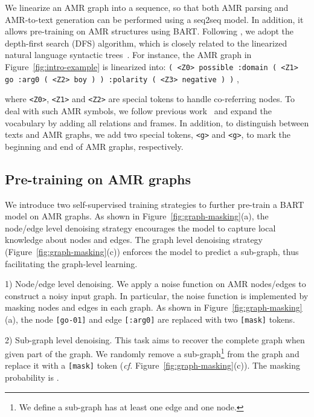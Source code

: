 \documentclass[11pt]{article}
\begin{document}
We linearize an AMR graph into a sequence, so that both AMR parsing and AMR-to-text generation can be performed using a seq2seq model.
In addition, it allows pre-training on AMR structures using BART.
Following \citet{konstas2017neural}, we adopt the depth-first search (DFS) algorithm, which is closely related to the linearized natural language syntactic trees~\cite{Bevilacqua_Blloshmi_Navigli_2021}.
For instance, the AMR graph in Figure~\ref{fig:intro-example} is linearized into:
\texttt{( <Z0> possible :domain ( <Z1> go :arg0 ( <Z2> boy ) ) :polarity ( <Z3> negative ) )} ,

\noindent where \texttt{<Z0>}, \texttt{<Z1>} and \texttt{<Z2>} are special tokens to handle co-referring nodes.
To deal with such AMR symbols, we follow previous work~\cite{Bevilacqua_Blloshmi_Navigli_2021} and expand the vocabulary by adding all relations and frames.
In addition, to distinguish between texts and AMR graphs, we add two special tokens, \texttt{<g>} and \texttt{<}\texttt{g>}, to mark the beginning and end of AMR graphs, respectively.


\subsection{Pre-training on AMR graphs}
\label{sec:graphrec}






We introduce two self-supervised training strategies to further pre-train a BART model on AMR graphs. 
As shown in Figure~\ref{fig:graph-masking}(a), the node/edge level denoising strategy encourages the model to capture local knowledge about nodes and edges. 
The graph level denoising strategy (Figure~\ref{fig:graph-masking}(c)) enforces the model to predict a sub-graph, thus facilitating the graph-level learning. 

1) Node/edge level denoising.
We apply a noise function on AMR nodes/edges to construct a noisy input graph.
In particular, the noise function is implemented by masking  nodes and  edges in each graph.
As shown in Figure~\ref{fig:graph-masking}(a), the node \texttt{[go-01]} and edge \texttt{[:arg0]} are replaced with two \texttt{[mask]} tokens. 

2) Sub-graph level denoising.
This task aims to recover the complete graph when given part of the graph.
We randomly remove a sub-graph\footnote{We define a sub-graph has at least one edge and one node.} from the graph and replace it with a \texttt{[mask]} token (\textit{cf.} Figure~\ref{fig:graph-masking}(c)). 
The masking probability is .
\end{document}
